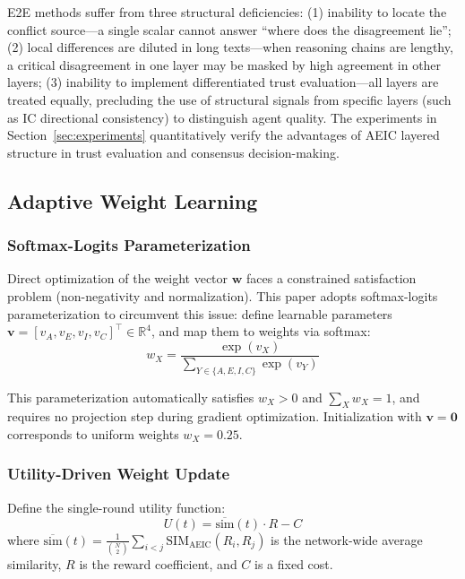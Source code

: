 \documentclass[12pt,a4paper]{article}
\begin{document}
E2E methods suffer from three structural deficiencies: (1) inability to locate the conflict source---a single scalar cannot answer ``where does the disagreement lie''; (2) local differences are diluted in long texts---when reasoning chains are lengthy, a critical disagreement in one layer may be masked by high agreement in other layers; (3) inability to implement differentiated trust evaluation---all layers are treated equally, precluding the use of structural signals from specific layers (such as IC directional consistency) to distinguish agent quality. The experiments in Section~\ref{sec:experiments} quantitatively verify the advantages of AEIC layered structure in trust evaluation and consensus decision-making.

\subsection{Adaptive Weight Learning}\label{sec:adaptive}

\subsubsection{Softmax-Logits Parameterization}

Direct optimization of the weight vector $\mathbf{w}$ faces a constrained satisfaction problem (non-negativity and normalization). This paper adopts softmax-logits parameterization to circumvent this issue: define learnable parameters $\mathbf{v} = [v_A, v_E, v_I, v_C]^\top \in \mathbb{R}^4$, and map them to weights via softmax:
\begin{equation}\label{eq:softmax}
w_X = \frac{\exp(v_X)}{\sum_{Y \in \{A,E,I,C\}} \exp(v_Y)}
\end{equation}

This parameterization automatically satisfies $w_X > 0$ and $\sum_X w_X = 1$, and requires no projection step during gradient optimization. Initialization with $\mathbf{v} = \mathbf{0}$ corresponds to uniform weights $w_X = 0.25$.

\subsubsection{Utility-Driven Weight Update}

Define the single-round utility function:
\begin{equation}
U(t) = \overline{\text{sim}}(t) \cdot R - C
\end{equation}
where $\overline{\text{sim}}(t) = \frac{1}{\binom{N}{2}} \sum_{i<j} \text{SIM}_{\text{AEIC}}(R_i, R_j)$ is the network-wide average similarity, $R$ is the reward coefficient, and $C$ is a fixed cost.
\end{document}
